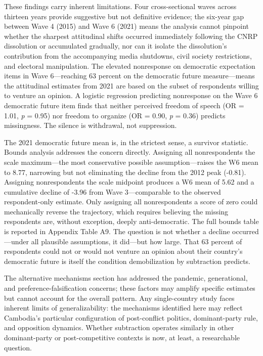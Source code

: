 \documentclass[
  12pt,
  letterpaper]{article}
\begin{document}
These findings carry inherent limitations. Four cross-sectional waves
across thirteen years provide suggestive but not definitive evidence;
the six-year gap between Wave 4 (2015) and Wave 6 (2021) means the
analysis cannot pinpoint whether the sharpest attitudinal shifts
occurred immediately following the CNRP dissolution or accumulated
gradually, nor can it isolate the dissolution's contribution from the
accompanying media shutdowns, civil society restrictions, and electoral
manipulation. The elevated nonresponse on democratic expectation items
in Wave 6---reaching 63 percent on the democratic future measure---means
the attitudinal estimates from 2021 are based on the subset of
respondents willing to venture an opinion. A logistic regression
predicting nonresponse on the Wave 6 democratic future item finds that
neither perceived freedom of speech (OR = 1.01, \emph{p} = 0.95) nor
freedom to organize (OR = 0.90, \emph{p} = 0.36) predicts missingness.
The silence is withdrawal, not suppression.

The 2021 democratic future mean is, in the strictest sense, a survivor
statistic. Bounds analysis addresses the concern directly. Assigning all
nonrespondents the scale maximum---the most conservative possible
assumption---raises the W6 mean to 8.77, narrowing but not eliminating
the decline from the 2012 peak (-0.81). Assigning nonrespondents the
scale midpoint produces a W6 mean of 5.62 and a cumulative decline of
-3.96 from Wave 3---comparable to the observed respondent-only estimate.
Only assigning all nonrespondents a score of zero could mechanically
reverse the trajectory, which requires believing the missing respondents
are, without exception, deeply anti-democratic. The full bounds table is
reported in Appendix Table A9. The question is not whether a decline
occurred---under all plausible assumptions, it did---but how large. That
63 percent of respondents could not or would not venture an opinion
about their country's democratic future is itself the condition
demobilization by subtraction predicts.

The alternative mechanisms section has addressed the pandemic,
generational, and preference-falsification concerns; these factors may
amplify specific estimates but cannot account for the overall pattern.
Any single-country study faces inherent limits of generalizability: the
mechanisms identified here may reflect Cambodia's particular
configuration of post-conflict politics, dominant-party rule, and
opposition dynamics. Whether subtraction operates similarly in other
dominant-party or post-competitive contexts is now, at least, a
researchable question.
\end{document}
